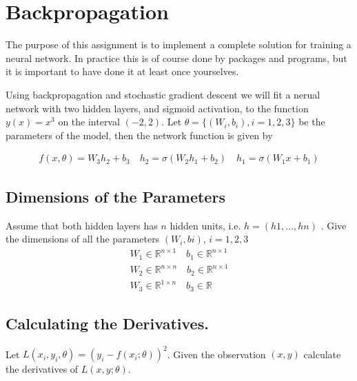 




\section{Backpropagation}

The purpose of this assignment is to implement a complete solution for training a neural network. In practice this is of course done by packages and programs, but it is important to have done it at least once yourselves.

Using backpropagation and stochastic gradient descent we will fit a nerual network with two hidden layers, and sigmoid activation, to the function $y(x) = x^3$ on the interval $(-2, 2)$. Let $\theta = \{(W_i, b_i), i = 1, 2, 3\}$ be the parameters of the model, then the network function is given by

\begin{align*}
    f(x,\theta) = W_3h_2 + b_3 \quad h_2 = \sigma(W_2h_1 + b_2) \quad h_1 = \sigma(W_1x + b_1)
\end{align*}

\subsection{Dimensions of the Parameters}

Assume that both hidden layers has $n$ hidden units, i.e. $h = (h1, . . . , hn)$ . Give the dimensions of all the
parameters $(W_i,bi)$, $i=1,2,3$
\begin{align*}
    W_1 \in \mathbb{R}^{n \times 1} \quad b_1 \in \mathbb{R}^{n \times 1}\\
    W_2 \in \mathbb{R}^{n \times n} \quad b_2 \in \mathbb{R}^{n \times 1} \\
    W_3 \in \mathbb{R}^{1 \times n} \quad b_3 \in \mathbb{R} \ \ \ \ \
\end{align*}

\subsection{Calculating the Derivatives.}

Let $L(x_i, y_i, \theta) = (y_i - f(x_i; \theta))^2$. Given the observation $(x,y)$ calculate the derivatives of $L(x,y;\theta)$.

